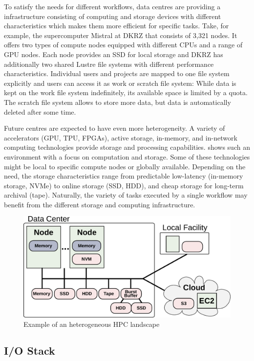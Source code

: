 \documentclass[a4paper]{article}
\newcommand{\jk}[1]{\todo[inline]{JK: #1}}
\begin{document}
To satisfy the needs for different workflows, data centres are providing a infrastructure consisting of computing and storage devices with different characteristics which makes them more efficient for specific tasks.
Take, for example, the supercomputer Mistral at DKRZ that consists of 3,321 nodes.
It offers two types of compute nodes equipped with different CPUs and a range of GPU nodes.
Each node provides an SSD for local storage and DKRZ has additionally two shared Lustre file systems with different performance characteristics.
Individual users and projects are mapped to one file system explicitly and users can access it as work or scratch file system: While data is kept on the work file system indefinitely, its available space is limited by a quota.
The scratch file system allows to store more data, but data is automatically deleted after some time.

Future centres are expected to have even more heterogeneity. A variety of accelerators (GPU, TPU, FPGAs), active storage, in-memory, and in-network computing technologies provide storage and processing capabilities.
 shows such an environment with a focus on computation and storage.
Some of these technologies might be local to specific compute nodes or globally available.
Depending on the need, the storage characteristics range from predictable low-latency (in-memory storage, NVMe) to online storage (SSD, HDD), and cheap storage for long-term archival (tape).
\jk{Mention BBs, e.g., DDN IME}
Naturally, the variety of tasks executed by a single workflow may benefit from the different storage and computing infrastructure.

\begin{figure}[H]
  \centering
  \includegraphics[width=0.6\columnwidth]{system}
  \caption{Example of an heterogeneous HPC landscape}
  \label{fig:heterogeneous}
\end{figure}


\subsection{I/O Stack}
\end{document}
